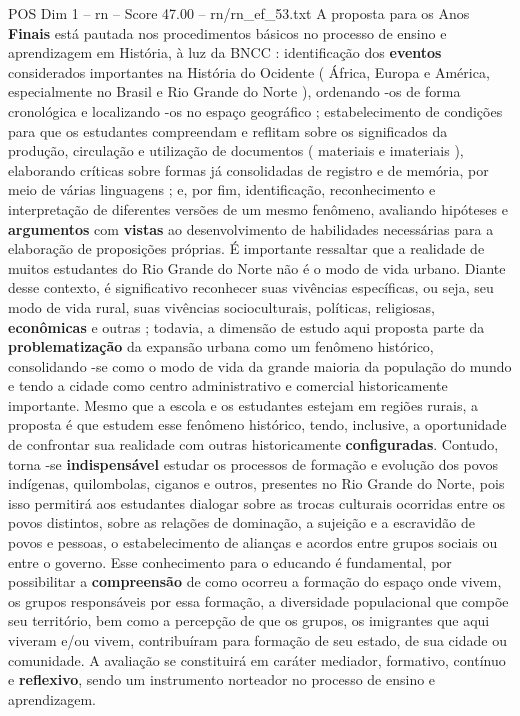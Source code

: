 \begin{textsample}{POS Dim 1 – rn – Score 47.00 – rn/rn\_ef\_53.txt}
A proposta para os Anos \textbf{Finais} está pautada nos procedimentos básicos no processo de ensino e aprendizagem em História, à luz da BNCC : identificação dos \textbf{eventos} considerados importantes na História do Ocidente ( África, Europa e América, especialmente no Brasil e Rio Grande do Norte ), ordenando -os de forma cronológica e localizando -os no espaço geográfico ; estabelecimento de condições para que os estudantes compreendam e reflitam sobre os significados da produção, circulação e utilização de documentos ( materiais e imateriais ), elaborando críticas sobre formas já consolidadas de registro e de memória, por meio de várias linguagens ; e, por fim, identificação, reconhecimento e interpretação de diferentes versões de um mesmo fenômeno, avaliando hipóteses e \textbf{argumentos} com \textbf{vistas} ao desenvolvimento de habilidades necessárias para a elaboração de proposições próprias.
É importante ressaltar que a realidade de muitos estudantes do Rio Grande do Norte não é o modo de vida urbano.
Diante desse contexto, é significativo reconhecer suas vivências específicas, ou seja, seu modo de vida rural, suas vivências socioculturais, políticas, religiosas, \textbf{econômicas} e outras ; todavia, a dimensão de estudo aqui proposta parte da \textbf{problematização} da expansão urbana como um fenômeno histórico, consolidando -se como o modo de vida da grande maioria da população do mundo e tendo a cidade como centro administrativo e comercial historicamente importante.
Mesmo que a escola e os estudantes estejam em regiões rurais, a proposta é que estudem esse fenômeno histórico, tendo, inclusive, a oportunidade de confrontar sua realidade com outras historicamente \textbf{configuradas}.
Contudo, torna -se \textbf{indispensável} estudar os processos de formação e evolução dos povos indígenas, quilombolas, ciganos e outros, presentes no Rio Grande do Norte, pois isso permitirá aos estudantes dialogar sobre as trocas culturais ocorridas entre os povos distintos, sobre as relações de dominação, a sujeição e a escravidão de povos e pessoas, o estabelecimento de alianças e acordos entre grupos sociais ou entre o governo.
Esse conhecimento para o educando é fundamental, por possibilitar a \textbf{compreensão} de como ocorreu a formação do espaço onde vivem, os grupos responsáveis por essa formação, a diversidade populacional que compõe seu território, bem como a percepção de que os grupos, os imigrantes que aqui viveram e/ou vivem, contribuíram para formação de seu estado, de sua cidade ou comunidade.
A avaliação se constituirá em caráter mediador, formativo, contínuo e \textbf{reflexivo}, sendo um instrumento norteador no processo de ensino e aprendizagem.

\end{textsample}
